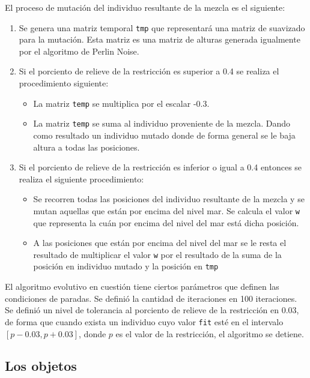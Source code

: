 El proceso de mutación del individuo resultante de la mezcla es el siguiente:

\begin{enumerate}
	\item Se genera una matriz temporal \verb|tmp| que representará una matriz de suavizado para la mutación. Esta matriz es una matriz de alturas generada igualmente por el algoritmo de Perlin Noise.
	\item Si el porciento de relieve de la restricción es superior a 0.4 se realiza el procedimiento siguiente:
	\begin{itemize}
		\item La matriz \verb|temp| se multiplica por el escalar -0.3.
		\item La matriz \verb|temp| se suma al individuo proveniente de la mezcla. Dando como resultado un individuo mutado donde de forma general se le baja altura a todas las posiciones.  
	\end{itemize}
	\item Si el porciento de relieve de la restricción es inferior o igual a 0.4 entonces se realiza el siguiente procedimiento: 
	\begin{itemize}
		\item Se recorren todas las posiciones del individuo resultante de la mezcla y se mutan aquellas que están por encima del nivel mar. Se calcula el valor \verb|w| que representa la cuán por encima del nivel del mar está dicha posición.
		\item A las posiciones que están por encima del nivel del mar se le resta el resultado de multiplicar el valor \verb|w| por el resultado de la suma de la posición en individuo mutado y  la posición en \verb|tmp|
	\end{itemize}
\end{enumerate}

El algoritmo evolutivo en cuestión tiene ciertos parámetros que definen las condiciones de paradas. Se definió la cantidad de iteraciones en 100 iteraciones. Se definió un nivel de tolerancia al porciento de relieve de la restricción en 0.03, de forma que cuando exista un individuo cuyo valor \verb|fit| esté en el intervalo $[p - 0.03, p + 0.03]$, donde $p$ es el valor de la restricción, el algoritmo se detiene.

\subsection{Los objetos}

